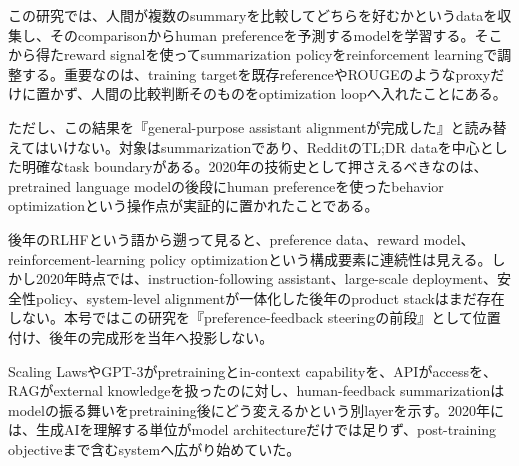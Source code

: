 この研究では、人間が複数のsummaryを比較してどちらを好むかというdataを収集し、そのcomparisonからhuman preferenceを予測するmodelを学習する。そこから得たreward signalを使ってsummarization policyをreinforcement learningで調整する。重要なのは、training targetを既存referenceやROUGEのようなproxyだけに置かず、人間の比較判断そのものをoptimization loopへ入れたことにある。\autocite{src-8622fc1e22c2,src-e5838d162a66}


ただし、この結果を『general-purpose assistant alignmentが完成した』と読み替えてはいけない。対象はsummarizationであり、RedditのTL;DR dataを中心とした明確なtask boundaryがある。2020年の技術史として押さえるべきなのは、pretrained language modelの後段にhuman preferenceを使ったbehavior optimizationという操作点が実証的に置かれたことである。\autocite{src-8622fc1e22c2,src-e5838d162a66}


後年のRLHFという語から遡って見ると、preference data、reward model、reinforcement-learning policy optimizationという構成要素に連続性は見える。しかし2020年時点では、instruction-following assistant、large-scale deployment、安全性policy、system-level alignmentが一体化した後年のproduct stackはまだ存在しない。本号ではこの研究を『preference-feedback steeringの前段』として位置付け、後年の完成形を当年へ投影しない。\autocite{src-8622fc1e22c2,src-e5838d162a66}


Scaling LawsやGPT-3がpretrainingとin-context capabilityを、APIがaccessを、RAGがexternal knowledgeを扱ったのに対し、human-feedback summarizationはmodelの振る舞いをpretraining後にどう変えるかという別layerを示す。2020年には、生成AIを理解する単位がmodel architectureだけでは足りず、post-training objectiveまで含むsystemへ広がり始めていた。\autocite{src-8622fc1e22c2,src-e5838d162a66}


